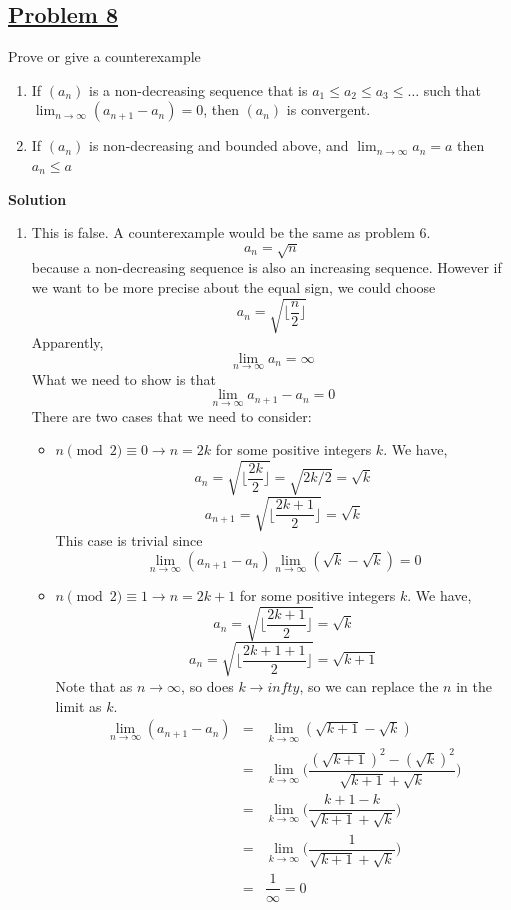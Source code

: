 \documentclass[10pt,letterpaper]{article}
\newcommand{\sol}{\textbf{Solution}}
\begin{document}
	\subsection*{{\color{red}\underline{Problem 8}}}
	Prove or give a counterexample
	\begin{enumerate}[label=(\roman{*})]
		\item If $(a_n)$ is a non-decreasing sequence that is $a_1 \leq a_2 \leq a_3 \leq \ldots$ such that
		$\displaystyle\lim_{n\to \infty}(a_{n+1} - a_n) = 0$, then $(a_n)$ is convergent.
		\item If $(a_n)$ is non-decreasing and bounded above, and $\displaystyle\lim_{n\to \infty}a_n = a$ then $a_n \leq a$
	\end{enumerate}
	\sol
	\begin{enumerate}[label=(\roman{*})]
		\item This is false. A counterexample would be the same as problem 6.
			$$a_n = \sqrt{n}$$
		because a non-decreasing sequence is also an increasing sequence.
		However if we want to be more precise about the equal sign, we could choose
			$$a_n = \sqrt{\bigg\lfloor \dfrac{n}{2} \bigg\rfloor}$$
		Apparently, 
			$$\displaystyle\lim_{n\to\infty} a_n = \infty$$
		What we need to show is that 
			$$\displaystyle\lim_{n\to\infty} a_{n+1} - a_{n} = 0$$
		There are two cases that we need to consider:
		\begin{itemize}
			\item $n \pmod{2} \equiv 0 \rightarrow n = 2k$ for some positive integers $k$. We have,
			$$a_{n} = \sqrt{\bigg\lfloor \dfrac{2k}{2} \bigg\rfloor} = \sqrt{2k/2} = \sqrt{k}$$
			$$a_{n+1} = \sqrt{\bigg\lfloor \dfrac{2k+1}{2} \bigg\rfloor} = \sqrt{k}$$ 
			This case is trivial since 
				$$\displaystyle\lim_{n\to\infty} (a_{n+1} - a_{n}) 
				\displaystyle\lim_{n\to\infty} (\sqrt{k} - \sqrt{k}) = 0$$
			\item $n \pmod{2} \equiv 1 \rightarrow n = 2k + 1$ for some positive integers $k$. We have,
			 $$a_{n} = \sqrt{\bigg\lfloor \dfrac{2k+1}{2} \bigg\rfloor} = \sqrt{k}$$
			 $$a_{n} = \sqrt{\bigg\lfloor \dfrac{2k+1+1}{2} \bigg\rfloor} = \sqrt{k+1}$$
			 Note that as $n \rightarrow \infty$, so does $k \rightarrow infty$, so 
			 we can replace the $n$ in the limit as $k$.
			\begin{eqnarray*}
			\displaystyle\lim_{n\to \infty} (a_{n+1} - a_{n}) 
			&=& \displaystyle\lim_{k\to \infty} (\sqrt{k+1} - \sqrt{k}) \\
			&=& \displaystyle\lim_{k\to \infty} 
			\bigg(\dfrac{(\sqrt{k+1})^2 - (\sqrt{k})^2}{\sqrt{k+1} + \sqrt{k}}\bigg) \\
			&=& \displaystyle\lim_{k\to \infty} 
			\bigg(\dfrac{k + 1 - k}{\sqrt{k+1} + \sqrt{k}}\bigg) \\
			&=& \displaystyle\lim_{k\to \infty} 
			\bigg(\dfrac{1}{\sqrt{k+1} + \sqrt{k}}\bigg)\\
			&=& \dfrac{1}{\infty} = 0
			\end{eqnarray*}  
		\end{itemize}
			

\end{enumerate}
\end{document}
